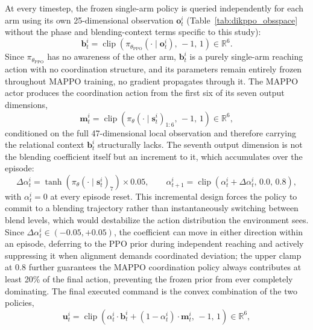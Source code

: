 At every timestep, the frozen single-arm policy is queried independently for each arm
using its own 25-dimensional observation $\mathbf{o}_t^i$ (Table~\ref{tab:dikppo_obsspace} without
the phase and blending-context terms specific to this study):
\begin{equation}
\mathbf{b}_t^i = \operatorname{clip}\!\left( \pi_{\theta_{\text{PPO}}}(\cdot \mid \mathbf{o}_t^i),\, -1,\, 1 \right) \in \mathbb{R}^6.
\label{eq:alpha_baseaction}
\end{equation}
Since $\pi_{\theta_{\text{PPO}}}$ has no awareness of the other arm, $\mathbf{b}_t^i$ is a purely
single-arm reaching action with no coordination structure, and its parameters remain entirely
frozen throughout MAPPO training, no gradient propagates through it. The MAPPO actor produces the
coordination action from the first six of its seven output dimensions,
\begin{equation}
\mathbf{m}_t^i = \operatorname{clip}\!\left( \pi_\theta(\cdot \mid \mathbf{s}_t^i)_{1:6},\, -1,\, 1 \right) \in \mathbb{R}^6,
\label{eq:alpha_coordaction}
\end{equation}
conditioned on the full 47-dimensional local observation and therefore carrying the relational
context $\mathbf{b}_t^i$ structurally lacks. The seventh output dimension is not the blending
coefficient itself but an increment to it, which accumulates over the episode:
\begin{equation}
\Delta \alpha_t^i = \tanh\!\left( \pi_\theta(\cdot \mid \mathbf{s}_t^i)_7 \right) \times 0.05, \qquad
\alpha_{t+1}^i = \operatorname{clip}\!\left( \alpha_t^i + \Delta \alpha_t^i,\, 0.0,\, 0.8 \right),
\label{eq:alpha_increment}
\end{equation}
with $\alpha_t^i = 0$ at every episode reset. This incremental design forces the policy to commit
to a blending trajectory rather than instantaneously switching between blend levels, which would
destabilize the action distribution the environment sees. Since $\Delta \alpha_t^i \in
(-0.05, +0.05)$, the coefficient can move in either direction within an episode, deferring to the
PPO prior during independent reaching and actively suppressing it when alignment demands
coordinated deviation; the upper clamp at 0.8 further guarantees the MAPPO coordination policy
always contributes at least 20\% of the final action, preventing the frozen prior from ever
completely dominating. The final executed command is the convex combination of the two policies,
\begin{equation}
\mathbf{u}_t^i = \operatorname{clip}\!\left( \alpha_t^i \cdot \mathbf{b}_t^i + (1 - \alpha_t^i) \cdot \mathbf{m}_t^i,\, -1,\, 1 \right) \in \mathbb{R}^6,
\label{eq:alpha_combined}
\end{equation}
